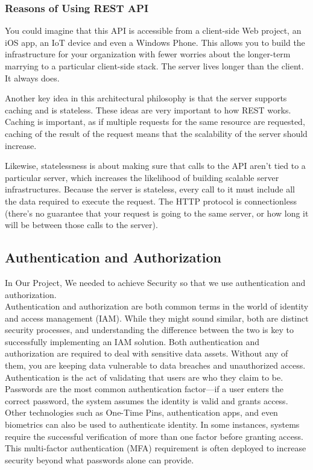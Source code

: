 \subsubsection{Reasons of Using REST API}
\hspace{2cm} You could imagine that this API is accessible from a client-side Web project, an iOS app, an IoT device and even a Windows Phone. This allows you to build the infrastructure for your organization with fewer worries about the longer-term marrying to a particular client-side stack. The server lives longer than the client. It always does.

Another key idea in this architectural philosophy is that the server supports caching and is stateless. These ideas are very important to how REST works. Caching is important, as if multiple requests for the same resource are requested, caching of the result of the request means that the scalability of the server should increase.

Likewise, statelessness is about making sure that calls to the API aren't tied to a particular server, which increases the likelihood of building scalable server infrastructures. Because the server is stateless, every call to it must include all the data required to execute the request. The HTTP protocol is connectionless (there's no guarantee that your request is going to the same server, or how long it will be between those calls to the server).\cite{web005}


\subsection{Authentication and Authorization}
\hspace{2cm}In Our Project, We needed  to achieve Security so that we use authentication and authorization.\\
Authentication and authorization are both common terms in the world of identity and access management (IAM). While they might sound similar, both are distinct security processes, and understanding the difference between the two is key to successfully implementing an IAM solution.
Both authentication and authorization are required to deal with sensitive data assets. Without any of them, you are keeping data vulnerable to data breaches and unauthorized access. \\

Authentication is the act of validating that users are who they claim to be. Passwords are the most common authentication factor—if a user enters the correct password, the system assumes the identity is valid and grants access.\\
Other technologies such as One-Time Pins, authentication apps, and even biometrics can also be used to authenticate identity. In some instances, systems require the successful verification of more than one factor before granting access. This multi-factor authentication (MFA) requirement is often deployed to increase security beyond what passwords alone can provide.\\

